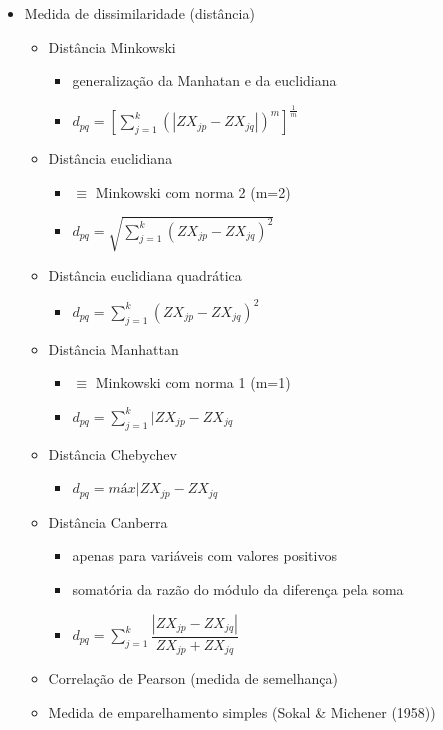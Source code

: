 \documentclass[
  letterpaper,
  DIV=11,
  numbers=noendperiod]{scrreprt}
\providecommand{\tightlist}{%
  \setlength{\itemsep}{0pt}\setlength{\parskip}{0pt}}\usepackage{longtable,booktabs,array}
\begin{document}
\begin{itemize}
\tightlist
\item
  Medida de dissimilaridade (distância)

  \begin{itemize}
  \item
    Distância Minkowski

    \begin{itemize}
    \tightlist
    \item
      generalização da Manhatan e da euclidiana
    \item
      \(d_{pq}=\left[\sum_{j=1}^k (|ZX_{jp}-ZX_{jq}|)^m \right ]^{\frac{1}{m}}\)\\
    \end{itemize}
  \item
    Distância euclidiana

    \begin{itemize}
    \tightlist
    \item
      \(\equiv\) Minkowski com norma 2 (m=2)
    \item
      \(d_{pq}=\sqrt{\sum_{j=1}^k (ZX_{jp}-ZX_{jq})^2}\)
    \end{itemize}
  \item
    Distância euclidiana quadrática

    \begin{itemize}
    \tightlist
    \item
      \(d_{pq}=\sum_{j=1}^k (ZX_{jp}-ZX_{jq})^2\)
    \end{itemize}
  \item
    Distância Manhattan

    \begin{itemize}
    \tightlist
    \item
      \(\equiv\) Minkowski com norma 1 (m=1)
    \item
      \(d_{pq}=\sum_{j=1}^k |ZX_{jp}-ZX_{jq}\)
    \end{itemize}
  \item
    Distância Chebychev

    \begin{itemize}
    \tightlist
    \item
      \(d_{pq}=máx|ZX_{jp}-ZX_{jq}\)
    \end{itemize}
  \item
    Distância Canberra

    \begin{itemize}
    \tightlist
    \item
      apenas para variáveis com valores positivos
    \item
      somatória da razão do módulo da diferença pela soma
    \item
      \(d_{pq}=\sum_{j=1}^k\dfrac{|ZX_{jp}-ZX_{jq}|}{ZX_{jp}+ZX_{jq}}\)
    \end{itemize}
  \item
    Correlação de Pearson (medida de semelhança)
  \item
    Medida de emparelhamento simples (Sokal \& Michener (1958))


\end{itemize}
\end{itemize}
\end{document}

